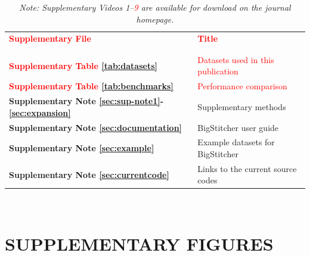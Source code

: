 \documentclass[]{spie}  %
\def\red{\textcolor{red}}
\newcommand\tablespace{\vspace{2.5mm}}
\begin{document}
\begin{table}[h!]
\center
{
\fontsize{12pt}{11pt}\selectfont
\center
\begin{tabular}{lp{11cm}}
\textbf{\textcolor{red}{Supplementary File}} & \textbf{\textcolor{red}{Title}}\\ \\
\hline
\\
\textbf{\red{Supplementary Table \ref{tab:datasets}}} & \red{Datasets used in this publication} \tablespace \\
\textbf{\red{Supplementary Table \ref{tab:benchmarks}}} & \red{Performance comparison} \tablespace \\
\textbf{Supplementary Note \ref{sec:sup-note1}-\ref{sec:expansion}} & Supplementary methods \tablespace \\
\textbf{Supplementary Note \ref{sec:documentation}} & BigStitcher user guide \tablespace \\
\textbf{Supplementary Note \ref{sec:example}} & Example datasets for BigStitcher \tablespace \\
\textbf{Supplementary Note \ref{sec:currentcode}} & Links to the current source codes \tablespace \\

\end{tabular}}
\caption{\emph{Note: Supplementary Videos 1--\red{9} are available for download on the journal homepage.}}
\end{table}

~
\pagebreak

\section*{SUPPLEMENTARY FIGURES}
\end{document}
